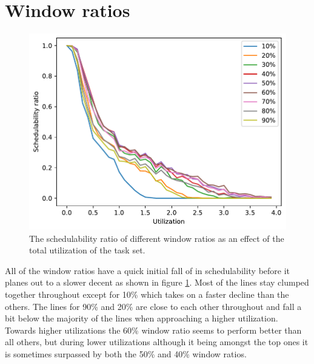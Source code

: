 \documentclass{kththesis}
\begin{document}
\section{Window ratios}\label{sec:result_window_ratios}

\begin{figure}[H]

    \centering

    \includegraphics[width=1.0\linewidth]{images/window_ratio.pdf}

    \caption{The schedulability ratio of different window ratios as an effect of the total
        utilization of the task set.}

    \label{fig:window_ratio}

\end{figure}

All of the window ratios have a quick initial fall of in schedulability before it planes out to a
slower decent as shown in figure \ref{fig:window_ratio}. Most of the lines stay clumped together
throughout except for 10\% which takes on a faster decline than the others. The lines for 90\% and
20\% are close to each other throughout and fall a bit below the majority of the lines when
approaching a higher utilization. Towards higher utilizations the 60\% window ratio seems to perform
better than all others, but during lower utilizations although it being amongst the top ones it is
sometimes surpassed by both the 50\% and 40\% window ratios.
\end{document}
